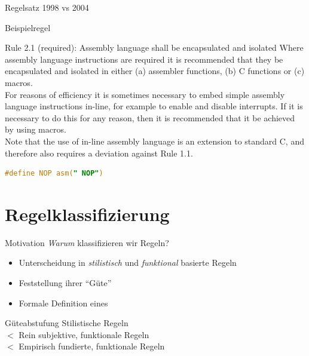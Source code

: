 \documentclass{beamer}
\begin{document}
    \begin{frame}{Regelsatz 1998 vs 2004}
        \begin{center}
            
        \end{center}
    \end{frame}

    \begin{frame}[fragile]{Beispielregel}
        \begin{exampleblock}{Rule 2.1 (required): Assembly language shall be encapsulated and isolated}
            Where assembly language instructions are required it is recommended that they be encapsulated
            and isolated in either (a) assembler functions, (b) C functions or (c) macros.\\
            For reasons of efficiency it is sometimes necessary to embed simple assembly language instructions
            in-line, for example to enable and disable interrupts.
            If it is necessary to do this for any reason, then it is recommended that it be achieved by using macros.\\
            Note that the use of in-line assembly language is an extension to standard C, and therefore also
            requires a deviation against Rule 1.1.
            \begin{lstlisting}[language=C]
                #define NOP asm(" NOP")
            \end{lstlisting}
        \end{exampleblock}
    \end{frame}

    \section{Regelklassifizierung}
    \label{sec:regelklassifizierung}
    \begin{frame}{Motivation}
        \textit{Warum} klassifizieren wir Regeln?
        \pause
        \begin{itemize}
            \item Unterscheidung in \textit{stilistisch} und \textit{funktional} basierte Regeln
            \item Feststellung ihrer \enquote{Güte}
            \item Formale Definition eines \slss
        \end{itemize}
        \pause
        \begin{block}{Güteabstufung}
            \quad \quad Stilistische Regeln\\
            {\boldmath $<$} \quad Rein subjektive, funktionale Regeln\\
            {\boldmath $<$} \quad Empirisch fundierte, funktionale Regeln
        \end{block}
    \end{frame}
\end{document}
